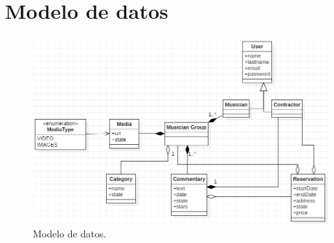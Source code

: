 \section{Modelo de datos}
\begin{figure}[htbp]
\centering%
\includegraphics[width=\textwidth,keepaspectratio=true]{Desarrollo/ModeloDatos/imgs/Clases.PNG}%
\caption{Modelo de datos.} \label{fig:modeldata}
\end{figure}